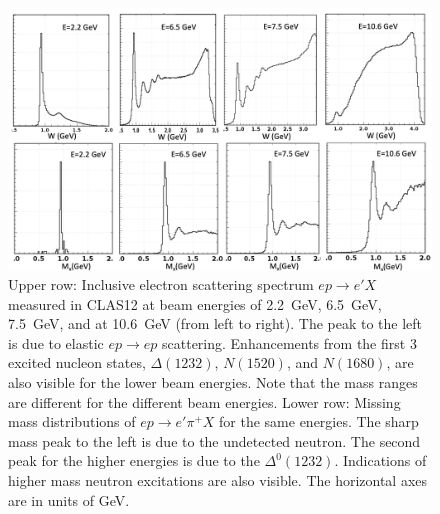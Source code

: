 \documentclass[final,3p,twocolumn]{elsarticle}
\begin{document}
\begin{figure}[t!]
\centerline{\includegraphics[width=2.0\columnwidth]{W-spectrum.png}}
\caption{Upper row: Inclusive electron scattering spectrum $ep \to e' X$ measured in CLAS12 at beam energies 
  of 2.2~GeV, 6.5~GeV, 7.5~GeV, and at 10.6~GeV (from left to right). The peak to the left is due to elastic
  $ep \to ep$ scattering. Enhancements from the first 3 excited nucleon states, $\Delta(1232)$, $N(1520)$,
  and $N(1680)$, are also visible for the lower beam energies. Note that the mass ranges  are different for the
  different beam energies. Lower row: Missing mass distributions of $ep\to e' \pi^+X$ for the same energies. The
  sharp mass peak to the left is due to the undetected neutron. The second peak for the higher energies is due to
  the $\Delta^0(1232)$. Indications of higher mass neutron excitations are also visible. The horizontal axes are in
  units of GeV.} 
\label{spectrum}
\end{figure} 
\end{document}
